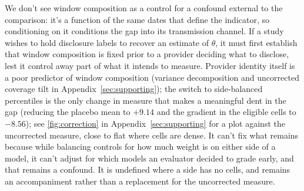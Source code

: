 We don't see window composition as a control for a confound external to the comparison: it's a function of the same dates that define the indicator, so conditioning on it conditions the gap into its transmission channel. If a study wishes to hold disclosure labels to recover an estimate of $\theta$, it must first establish that window composition is fixed prior to a provider deciding what to disclose, lest it control away part of what it intends to measure. Provider identity itself is a poor predictor of window composition (variance decomposition and uncorrected coverage tilt in Appendix~\ref{sec:supporting}); the switch to side-balanced percentiles is the only change in measure that makes a meaningful dent in the gap (reducing the placebo mean to $+9.14$ and the gradient in the eligible cells to $-8.56$); see \autoref{fig:correction} in Appendix~\ref{sec:supporting} for a plot against the uncorrected measure, close to flat where cells are dense. It can't fix what remains because while balancing controls for how much weight is on either side of a model, it can't adjust for which models an evaluator decided to grade early, and that remains a confound. It is undefined where a side has no cells, and remains an accompaniment rather than a replacement for the uncorrected measure.
